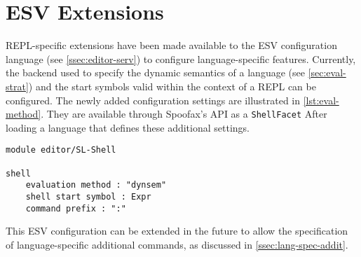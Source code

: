 \section{ESV Extensions}
\label{sec:esv-extensions}

REPL-specific extensions have been made available to the ESV configuration
language (see \cref{ssec:editor-serv}) to configure language-specific
features. Currently, the backend used to specify the dynamic semantics of a
language (see \cref{sec:eval-strat}) and the start symbols valid within the
context of a REPL can be configured. The newly added configuration settings are
illustrated in \cref{lst:eval-method}. They are available through Spoofax's API
as a \texttt{ShellFacet} After loading a language that defines
these additional settings.

\begin{lstlisting}[language=esv,caption={Configuring language specific settings.},label={lst:eval-method}]
module editor/SL-Shell

shell
    evaluation method : "dynsem"
    shell start symbol : Expr
    command prefix : ":"
\end{lstlisting}

This ESV configuration can be extended in the future to allow the specification
of language-specific additional commands, as discussed in
\cref{ssec:lang-spec-addit}.

